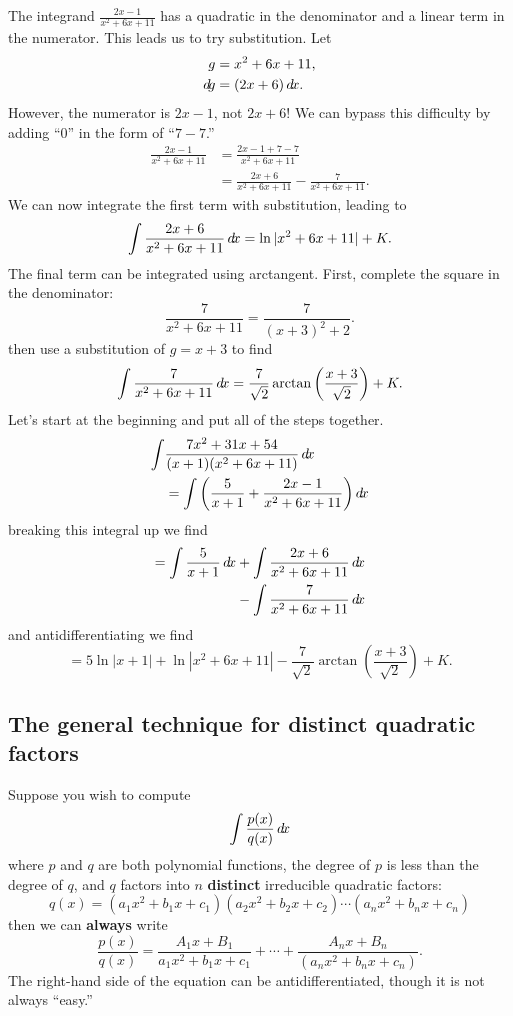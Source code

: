 \documentclass{ximera}
\begin{document}
\begin{example}
\begin{explanation}
    The integrand $\frac{2x-1}{x^2+6x+11}$ has a quadratic in the
    denominator and a linear term in the numerator. This leads us to
    try substitution. Let
    \begin{align*}
      g &= x^2+6x+11,\\
      \mathop{}\!d\! g  &= (2x+6)\mathop{}\!d\! x.
    \end{align*}
    However, the numerator is $2x-1$, not $2x+6$! We can bypass this
    difficulty by adding ``$0$'' in the form of ``$7-7$.''
\begin{align*}
  \frac{2x-1}{x^2+6x+11} &= \frac{2x-1+7-7}{x^2+6x+11} \\
  &= \frac{2x+6}{x^2+6x+11} - \frac{7}{x^2+6x+11}.
\end{align*}
We can now integrate the first term with substitution, leading to
\[
\int \frac{2x+6}{x^2+6x+11} \mathop{}\!d\! x = \ln|x^2+6x+11| + K.
\]
The final term can be integrated using arctangent. First, complete the
square in the denominator:
\[
\frac{7}{x^2+6x+11} = \frac{7}{(x+3)^2+2}.
\]
then use a substitution of $g = x+3$ to find
\[
\int \frac{7}{x^2+6x+11}\mathop{}\!d\! x = \frac{7}{\sqrt{2}}\arctan\left(\frac{x+3}{\sqrt{2}}\right)+K.
\]
Let's start at the beginning and put all of the steps together.
\begin{align*}
  \int&\frac{7x^2+31x+54}{(x+1)(x^2+6x+11)}\mathop{}\!d\! x \\
  &= \int\left(\frac{5}{x+1} + \frac{2x-1}{x^2+6x+11}\right)\mathop{}\!d\! x
\end{align*}
breaking this integral up we find
\begin{align*}
  = \int\frac{5}{x+1}\mathop{}\!d\! x  &+ \int\frac{2x+6}{x^2+6x+11}\mathop{}\!d\! x\\
  &-\int\frac{7}{x^2+6x+11}\mathop{}\!d\! x
\end{align*}
and antidifferentiating we find
\[
  = 5\ln|x+1|+ \ln|x^2+6x+11|-\frac{7}{\sqrt{2}}\arctan\left(\frac{x+3}{\sqrt{2}}\right)+K.
\]
  \end{explanation}
\end{example}


\subsection{The general technique for distinct quadratic factors}

Suppose you wish to compute
\[
\int \frac{p(x)}{q(x)} \mathop{}\!d\! x
\]
where $p$ and $q$ are both polynomial functions, the degree of $p$ is
less than the degree of $q$, and $q$ factors into $n$
\textbf{distinct} irreducible quadratic factors:
\[
q(x) = (a_1x^2 + b_1 x + c_1) (a_2x^2 + b_2 x + c_2)\cdots  (a_nx^2 + b_n x + c_n) 
\]
then we can \textbf{always} write
\[
\frac{p(x)}{q(x)}  = \frac{A_1x+B_1}{a_1x^2 + b_1 x + c_1} + \cdots + \frac{A_nx+B_n}{(a_nx^2 + b_n x + c_n)}. 
\]
The right-hand side of the equation can be antidifferentiated, though it is not always ``easy.''
\end{document}
